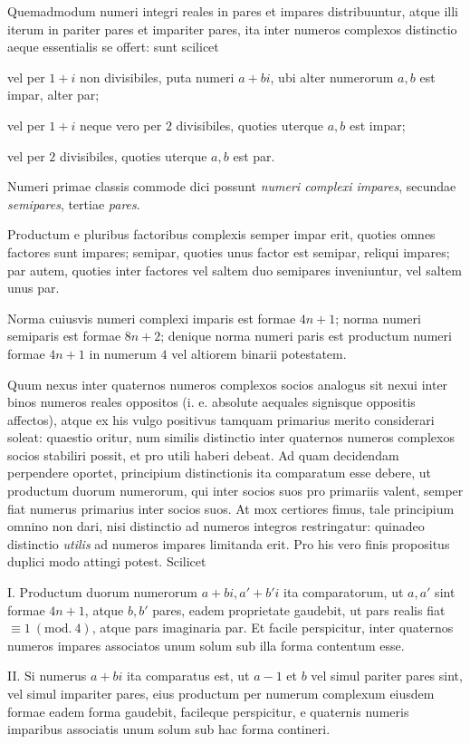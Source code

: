 Quemadmodum numeri integri reales in pares et impares distribuuntur, atque illi iterum in pariter pares et impariter pares, ita inter numeros complexos distinctio aeque essentialis se offert: sunt scilicet

vel per $1+i$ non divisibiles, puta numeri $a+bi$, ubi alter numerorum $a,b$ est impar, alter par;

vel per $1+i$ neque vero per $2$ divisibiles, quoties uterque $a,b$ est impar;

vel per $2$ divisibiles, quoties uterque $a,b$ est par.

Numeri primae classis commode dici possunt \emph{numeri complexi impares}, secundae \emph{semipares}, tertiae \emph{pares}.

Productum e pluribus factoribus complexis semper impar erit, quoties omnes factores sunt impares; semipar, quoties unus factor est semipar, reliqui impares; par autem, quoties inter factores vel saltem duo semipares inveniuntur, vel saltem unus par.

Norma cuiusvis numeri complexi imparis est formae $4n+1$; norma numeri semiparis est formae $8n+2$; denique norma numeri paris est productum numeri formae $4n+1$ in numerum $4$ vel altiorem binarii potestatem.

Quum nexus inter quaternos numeros complexos socios analogus sit nexui inter binos numeros reales oppositos (i. e. absolute aequales signisque oppositis affectos), atque ex his vulgo positivus tamquam primarius merito considerari soleat:
%
quaestio oritur, num similis distinctio inter quaternos numeros complexos socios stabiliri possit, et pro utili haberi debeat. Ad quam decidendam perpendere oportet, principium distinctionis ita comparatum esse debere, ut productum duorum numerorum, qui inter socios suos pro primariis valent, semper fiat numerus primarius inter socios suos. At mox certiores fimus, tale principium omnino non dari, nisi distinctio ad numeros integros restringatur: quinadeo distinctio \emph{utilis} ad numeros impares limitanda erit. Pro his vero finis propositus duplici modo attingi potest. Scilicet

I. Productum duorum numerorum $a+bi,a'+b'i$ ita comparatorum, ut $a,a'$ sint formae $4n+1$, atque $b,b'$ pares, eadem proprietate gaudebit, ut pars realis fiat $\equiv1\ (\mathrm{mod.}\ 4)$, atque pars imaginaria par. Et facile perspicitur, inter quaternos numeros impares associatos unum solum sub illa forma contentum esse.

II. Si numerus $a+bi$ ita comparatus est, ut $a-1$ et $b$ vel simul pariter pares sint, vel simul impariter pares, eius productum per numerum complexum eiusdem formae eadem forma gaudebit, facileque perspicitur, e quaternis numeris imparibus associatis unum solum sub hac forma contineri.

